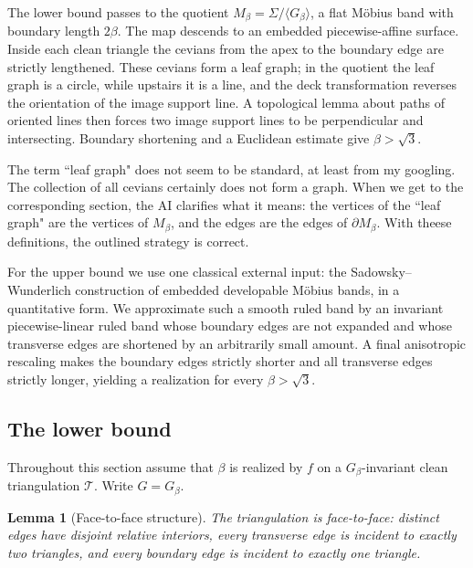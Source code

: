 \documentclass[12pt]{article}
\theoremstyle{plain}
\newtheorem{lemma}[theorem]{Lemma}
\newcommand{\review}[1]{\begin{reviewbox}#1\end{reviewbox}}
\begin{document}
The lower bound passes to the quotient
\(M_\beta=\Sigma/\langle G_\beta\rangle\), a flat M\"obius band with boundary
length \(2\beta\).  The map descends to an embedded piecewise-affine surface.
Inside each clean triangle the cevians from the apex to the boundary edge are
strictly lengthened.  These cevians form a leaf graph; in the quotient the leaf
graph is a circle, while upstairs it is a line, and the deck transformation
reverses the orientation of the image support line.  A topological lemma about
paths of oriented lines then forces two image support lines to be perpendicular
and intersecting.  Boundary shortening and a Euclidean estimate give
\(\beta>\sqrt3\).

\review{The term ``leaf graph" does not seem to be standard, at least from my googling. The collection of all cevians certainly does not form a graph. When we get to the corresponding section, the AI clarifies what it means: the vertices of the ``leaf graph" are the vertices of $M_\beta$, and the edges are the edges of $\partial M_\beta$. With theese definitions, the outlined strategy is correct.}

For the upper bound we use one classical external input: the
Sadowsky--Wunderlich construction of embedded developable M\"obius bands, in a
quantitative form.  We approximate such a smooth ruled band by an invariant
piecewise-linear ruled band whose boundary edges are not expanded and whose
transverse edges are shortened by an arbitrarily small amount.  A final
anisotropic rescaling makes the boundary edges strictly shorter and all
transverse edges strictly longer, yielding a realization for every
\(\beta>\sqrt3\).

\subsection{The lower bound}

Throughout this section assume that \(\beta\) is realized by \(f\) on a
\(G_\beta\)-invariant clean triangulation \(\mathcal T\).  Write
\(G=G_\beta\).

\begin{lemma}[Face-to-face structure]\label{lem:facetoface}
The triangulation is face-to-face: distinct edges have disjoint relative
interiors, every transverse edge is incident to exactly two triangles, and
every boundary edge is incident to exactly one triangle.
\end{lemma}
\end{document}
